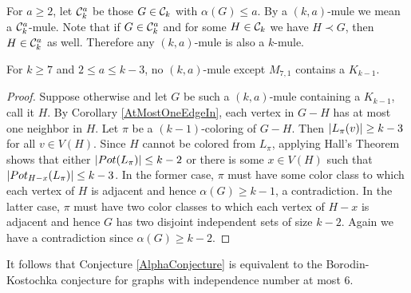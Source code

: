 For $a \geq 2$, let $\mathcal{C}_k^a$ be those $G \in \mathcal{C}_k$ with $\alpha(G)
\leq a$.  By a $(k,a)$-mule we mean a $\mathcal{C}_k^a$-mule. Note that if $G \in
\mathcal{C}_k^a$ and for some $H \in \mathcal{C}_k$ we have $H \prec G$, then $H \in \mathcal{C}_k^a$ as well.
Therefore any $(k,a)$-mule is also a $k$-mule.

\begin{thm}\label{SmallAlphaConj}
For $k \geq 7$ and $2 \leq a \leq k-3$, no $(k, a)$-mule except $M_{7,1}$
contains a $K_{k-1}$.
\end{thm}
\begin{proof}
Suppose otherwise and let $G$ be such a $(k, a)$-mule containing a $K_{k-1}$,
call it $H$. By Corollary \ref{AtMostOneEdgeIn}, each vertex in $G-H$ has at
most one neighbor in $H$.  Let $\pi$ be a $(k-1)$-coloring of $G-H$.  
Then $\left|L_\pi(v)\right| \geq k - 3$ for all $v \in V(H)$. Since
$H$ cannot be colored from $L_\pi$, applying Hall's Theorem shows that either
$\left|Pot(L_\pi)\right| \leq k - 2$ or there is some $x \in V(H)$ such that
$\left|Pot_{H-x}(L_\pi)\right| \leq k - 3$.  In the former case, $\pi$ must have some
color class to which each vertex of $H$ is adjacent and hence $\alpha(G) \geq
k-1$, a contradiction.  In the latter case, $\pi$ must have two color classes to
which each vertex of $H-x$ is adjacent and hence $G$ has two disjoint
independent sets of size $k-2$.  Again we have a contradiction since $\alpha(G)
\geq k-2$.
\end{proof}
It follows that Conjecture \ref{AlphaConjecture} is equivalent to the
Borodin-Kostochka conjecture for graphs with independence number at most $6$.

